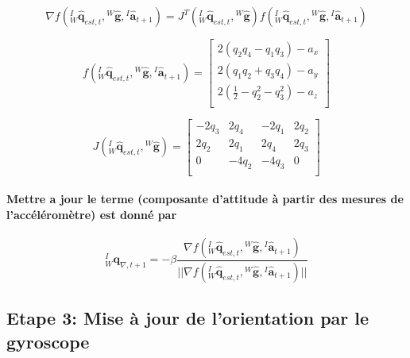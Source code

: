 \begin{equation}
	\nabla f\left( {}^{I}_{W}\mathbf{\hat{q}}_{est, t}, {}^{W}\mathbf{\hat{g}}, {}^{I}\mathbf{\hat{a}}_{t+1} \right) =  J^T\left( {}^{I}_{W}\mathbf{\hat{q}}_{est, t}, {}^{W}\mathbf{\hat{g}} \right) f\left( {}^{I}_{W}\mathbf{\hat{q}}_{est, t}, {}^{W}\mathbf{\hat{g}}, {}^{I}\mathbf{\hat{a}}_{t+1} \right)
\end{equation}

\begin{equation}
	f\left( {}^{I}_{W}\mathbf{\hat{q}}_{est, t}, {}^{W}\mathbf{\hat{g}}, {}^{I}\mathbf{\hat{a}}_{t+1} \right) = \begin{bmatrix}  
		2\left( q_2q_4 - q_1q_3\right) - a_x\\
		2\left( q_1q_2 + q_3q_4\right) - a_y\\
		2\left( \frac{1}{2} - q_2^2 - q_3^2\right) - a_z\\
		\end{bmatrix}
\end{equation}

\begin{equation}
	J\left( {}^{I}_{W}\mathbf{\hat{q}}_{est, t}, {}^{W}\mathbf{\hat{g}} \right) = \begin{bmatrix}  
		-2q_3 & 2q_4 & -2q_1 & 2q_2 \\
		2q_2 & 2q_1 & 2q_4 & 2q_3 \\
		0 & -4q_2 & -4q_3 & 0\\
		\end{bmatrix}
\end{equation}

\paragraph{Mettre a jour le terme (composante d'attitude à partir des mesures de l'accéléromètre) est donné par}

\begin{equation}
	{}^{I}_{W}\mathbf{q}_{\nabla, t+1} = - \beta\frac{\nabla f\left( {}^{I}_{W}\mathbf{\hat{q}}_{est, t}, {}^{W}\mathbf{\hat{g}}, {}^{I}\mathbf{\hat{a}}_{t+1} \right)}{\vert \vert  \nabla f\left( {}^{I}_{W}\mathbf{\hat{q}}_{est, t}, {}^{W}\mathbf{\hat{g}}, {}^{I}\mathbf{\hat{a}}_{t+1} \right) \vert \vert}
\end{equation}

\subsection{Etape 3: Mise à jour de l'orientation par le gyroscope}

